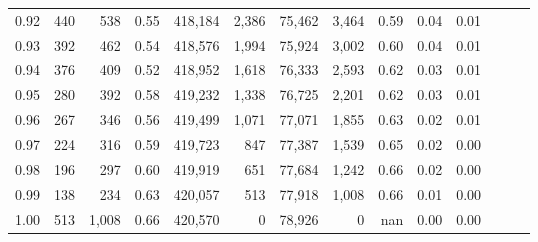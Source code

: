 \begin{tabular}{rrrrrrrrrrrrrr}
0.92 &    440 &    538 &  0.55 &  418,184 &    2,386 &  75,462 &   3,464 &  0.59 &  0.04 &      0.01 \\
0.93 &    392 &    462 &  0.54 &  418,576 &    1,994 &  75,924 &   3,002 &  0.60 &  0.04 &      0.01 \\
0.94 &    376 &    409 &  0.52 &  418,952 &    1,618 &  76,333 &   2,593 &  0.62 &  0.03 &      0.01 \\
0.95 &    280 &    392 &  0.58 &  419,232 &    1,338 &  76,725 &   2,201 &  0.62 &  0.03 &      0.01 \\
0.96 &    267 &    346 &  0.56 &  419,499 &    1,071 &  77,071 &   1,855 &  0.63 &  0.02 &      0.01 \\
0.97 &    224 &    316 &  0.59 &  419,723 &      847 &  77,387 &   1,539 &  0.65 &  0.02 &      0.00 \\
0.98 &    196 &    297 &  0.60 &  419,919 &      651 &  77,684 &   1,242 &  0.66 &  0.02 &      0.00 \\
0.99 &    138 &    234 &  0.63 &  420,057 &      513 &  77,918 &   1,008 &  0.66 &  0.01 &      0.00 \\
1.00 &    513 &  1,008 &  0.66 &  420,570 &        0 &  78,926 &       0 &   nan &  0.00 &      0.00 \\
\bottomrule
\end{tabular}
